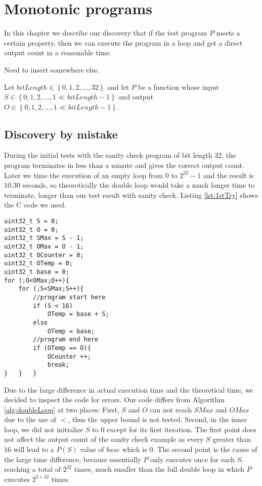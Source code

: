 \chapter{Monotonic programs}
	\label{CH_04}

In this chapter we describe our discovery that if the test program $P$ meets a certain property, then we can execute the program in a loop and get a direct output count in a reasonable time.

Need to insert somewhere else.

\begin{mydef}
Let $bitLength\in \left\{ {0,1,2,..., 32}\right\}$ and let $P$ be a function whose input $S \in \left\{ {0,1,2,..., 1\ll bitLength-1}\right\}$ and output $O \in \left\{ {0,1,2,..., 1\ll bitLength-1}\right\}$.
\end{mydef}

\section{Discovery by mistake}
During the initial tests with the sanity check program of bit length 32, the program terminates in less than a minute and gives the correct output count. Later we time the execution of an empty loop from $0$ to $2^{32} - 1$ and the result is $10.30$ seconds, so theoretically the double loop would take a much longer time to terminate, longer than our test result with sanity check.  Listing \ref{lst:1stTry} shows the C code we used.

\lstset{language=C}  
\begin{lstlisting}[caption={Initial implementation of the double loop with sanity check in C.},label=lst:1stTry]
uint32_t S = 0;
uint32_t O = 0;
uint32_t SMax = S - 1;
uint32_t OMax = O - 1;
uint32_t OCounter = 0;
uint32_t OTemp = 0;
uint32_t base = 0;
for (;O<OMax;O++){
	for (;S<SMax;S++){
		//program start here
		if (S < 16)
			OTemp = base + S;
		else
			OTemp = base;
		//program end here
		if (OTemp == O){
			OCounter ++;
			break;
}	}	}
\end{lstlisting}

Due to the large difference in actual execution time and the theoretical time, we decided to inspect the code for errors. Our code differs from Algorithm \ref{alg:doubleLoop} at two places: First, $S$ and $O$ can not reach $SMax$ and $OMax$ due to the use of $<$, thus the upper bound is not tested. Second, in the inner loop, we did not initialize $S$ to $0$ except for its first iteration. The first point does not affect the output count of the sanity check example as every $S$ greater than $16$ will lead to a $P(S)$ value of $base$ which is $0$. The second point is the cause of the large time difference, because essentially $P$ only executes once for each $S$, reaching a total of $2^{32}$ times, much smaller than the full double loop in which $P$ executes $2^{2 \times 32}$ times.

